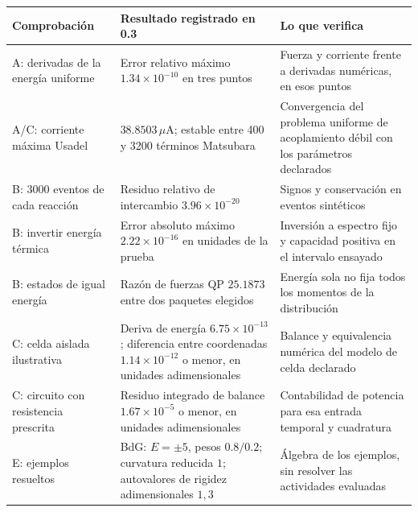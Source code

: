 \documentclass[
  spanish,
  10pt,
  a4paper,
]{article}
\newcounter{none} %
\begin{document}
{\def\LTcaptype{none} %
\begin{longtable}[]{@{}
  >{\raggedright\arraybackslash}p{}
  >{\raggedright\arraybackslash}p{}
  >{\raggedright\arraybackslash}p{}@{}}
\toprule\noalign{}
\begin{minipage}[b]{\linewidth}\raggedright
Comprobación
\end{minipage} & \begin{minipage}[b]{\linewidth}\raggedright
Resultado registrado en 0.3
\end{minipage} & \begin{minipage}[b]{\linewidth}\raggedright
Lo que verifica
\end{minipage} \\
\midrule\noalign{}
\endhead
\bottomrule\noalign{}
\endlastfoot
A: derivadas de la energía uniforme & Error relativo máximo
\(1.34\times10^{-10}\) en tres puntos & Fuerza y corriente frente a
derivadas numéricas, en esos puntos \\
A/C: corriente máxima Usadel & \(38.8503\,\mu\)A; estable entre 400 y
3200 términos Matsubara & Convergencia del problema uniforme de
acoplamiento débil con los parámetros declarados \\
B: 3000 eventos de cada reacción & Residuo relativo de intercambio
\(3.96\times10^{-20}\) & Signos y conservación en eventos sintéticos \\
B: invertir energía térmica & Error absoluto máximo
\(2.22\times10^{-16}\) en unidades de la prueba & Inversión a espectro
fijo y capacidad positiva en el intervalo ensayado \\
B: estados de igual energía & Razón de fuerzas QP \(25.1873\) entre dos
paquetes elegidos & Energía sola no fija todos los momentos de la
distribución \\
C: celda aislada ilustrativa & Deriva de energía \(6.75\times10^{-13}\);
diferencia entre coordenadas \(1.14\times10^{-12}\) o menor, en unidades
adimensionales & Balance y equivalencia numérica del modelo de celda
declarado \\
C: circuito con resistencia prescrita & Residuo integrado de balance
\(1.67\times10^{-5}\) o menor, en unidades adimensionales & Contabilidad
de potencia para esa entrada temporal y cuadratura \\
E: ejemplos resueltos & BdG: \(E=\pm5\), pesos \(0.8/0.2\); curvatura
reducida \(1\); autovalores de rigidez adimensionales \(1,3\) & Álgebra
de los ejemplos, sin resolver las actividades evaluadas \\
\end{longtable}
}
\end{document}
